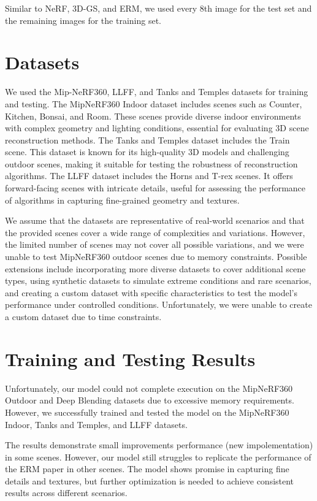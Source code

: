\documentclass[11pt]{report}
\begin{document}
Similar to NeRF, 3D-GS, and ERM, we used every 8th image for the test set and the remaining images for the training set.

\section{Datasets}
We used the Mip-NeRF360, LLFF, and Tanks and Temples datasets for training and testing. The MipNeRF360 Indoor dataset includes scenes such as Counter, Kitchen, Bonsai, and Room. These scenes provide diverse indoor environments with complex geometry and lighting conditions, essential for evaluating 3D scene reconstruction methods. The Tanks and Temples dataset includes the Train scene. This dataset is known for its high-quality 3D models and challenging outdoor scenes, making it suitable for testing the robustness of reconstruction algorithms. The LLFF dataset includes the Horns and T-rex scenes. It offers forward-facing scenes with intricate details, useful for assessing the performance of algorithms in capturing fine-grained geometry and textures.

We assume that the datasets are representative of real-world scenarios and that the provided scenes cover a wide range of complexities and variations. However, the limited number of scenes may not cover all possible variations, and we were unable to test MipNeRF360 outdoor scenes due to memory constraints. Possible extensions include incorporating more diverse datasets to cover additional scene types, using synthetic datasets to simulate extreme conditions and rare scenarios, and creating a custom dataset with specific characteristics to test the model's performance under controlled conditions. Unfortunately, we were unable to create a custom dataset due to time constraints.

\section{Training and Testing Results}
Unfortunately, our model could not complete execution on the MipNeRF360 Outdoor and Deep Blending datasets due to excessive memory requirements. However, we successfully trained and tested the model on the MipNeRF360 Indoor, Tanks and Temples, and LLFF datasets. 

The results demonstrate small improvements performance (new impolementation) in some scenes. However, our model still struggles to replicate the performance of the ERM paper in other scenes. The model shows promise in capturing fine details and textures, but further optimization is needed to achieve consistent results across different scenarios.
\end{document}
